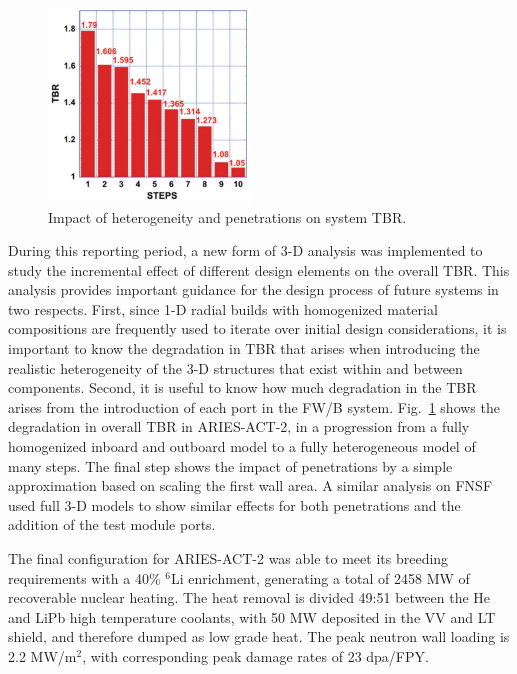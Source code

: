 \begin{figure}
\centering
\includegraphics[width=0.48\textwidth]{imgs/aries-act-2-tbr.png}
\caption{\label{fig:aries-act-2-tbr}Impact of heterogeneity and penetrations on system \gls{TBR}.}
\end{figure}

During this reporting period, a new form of 3-D analysis was implemented to
study the incremental effect of different design elements on the overall
\gls{TBR}.  This analysis provides important guidance for the design process
of future systems in two respects.  First, since 1-D radial builds with
homogenized material compositions are frequently used to iterate over initial
design considerations, it is important to know the degradation in \gls{TBR}
that arises when introducing the realistic heterogeneity of the 3-D structures
that exist within and between components.  Second, it is useful to know how
much degradation in the \gls{TBR} arises from the introduction of each port in
the \gls{FW/B} system.  Fig.\ \ref{fig:aries-act-2-tbr} shows the degradation
in overall \gls{TBR} in ARIES-ACT-2, in a progression from a fully homogenized
inboard and outboard model to a fully heterogeneous model of many
steps. The final step shows the impact of penetrations by a
simple approximation based on scaling the first wall area.  A similar analysis
on FNSF used full 3-D models to show similar effects for both penetrations and
the addition of the test module ports.

The final configuration for ARIES-ACT-2 was able to meet its breeding
requirements with a 40\% $^6$Li enrichment, generating a total of 2458 MW of
recoverable nuclear heating.  The heat removal is divided 49:51 between the He
and LiPb high temperature coolants, with 50 MW deposited in the VV and LT
shield, and therefore dumped as low grade heat.  The peak neutron wall loading
is 2.2 MW/m$^2$, with corresponding peak damage rates of 23
dpa/FPY.

